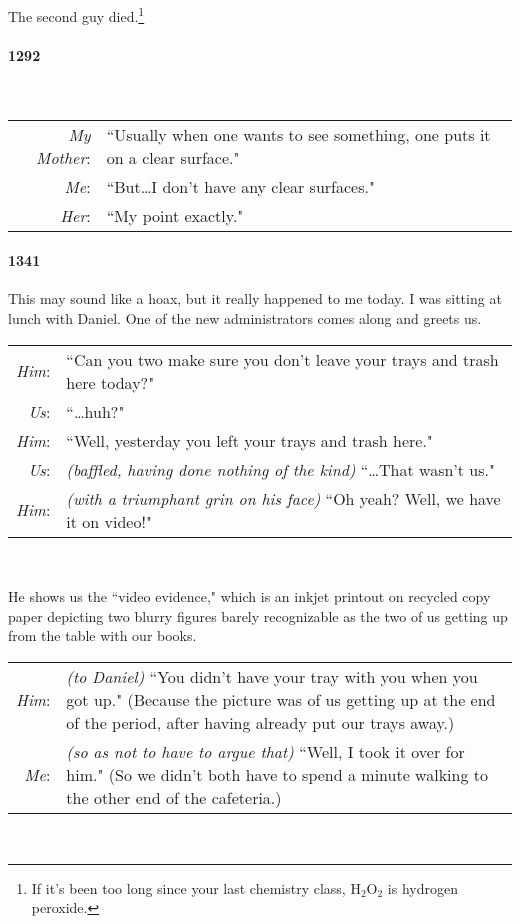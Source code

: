 \documentclass[10pt]{memoir}
\newcommand{\speakertag}[1]{\emph{#1}: }
\newcommand{\st}{\speakertag}
\begin{document}
The second guy died.\footnote{If it's been too long since your last chemistry class, $\textrm{H}_2\textrm{O}_2$ is hydrogen peroxide.}

\paragraph{1292}~\\
\noindent \begin{tabularx}{\textwidth}{r X}
\noindent \st{My Mother} & ``Usually when one wants to see something, one puts it on a clear surface." \\
\st{Me} & ``But\ldots I don't have any clear surfaces." \\
\st{Her} & ``My point exactly." \\
\end{tabularx}

\paragraph{1341} This may sound like a hoax, but it really happened to me today. I was sitting at lunch with Daniel. One of the new administrators comes along and greets us.\\

\noindent \begin{tabularx}{\textwidth}{r X}
\noindent \st{Him} & ``Can you two make sure you don't leave your trays and trash here today?"\\
\st{Us} & ``\ldots huh?"\\
\st{Him} & ``Well, yesterday you left your trays and trash here." \\
\st{Us} & \emph{(baffled, having done nothing of the kind)} ``\ldots That wasn't us."\\
\st{Him} & \emph{(with a triumphant grin on his face)} ``Oh yeah? Well, we have it on video!"
\end{tabularx}\\\smallskip

\noindent He shows us the ``video evidence," which is an inkjet printout on recycled copy paper depicting two blurry figures barely recognizable as the two of us getting up from the table with our books.\\

\noindent \begin{tabularx}{\textwidth}{r X}
\st{Him} & \emph{(to Daniel)} ``You didn't have your tray with you when you got up." (Because the picture was of us getting up at the end of the period, after having already put our trays away.)\\
\st{Me} & \emph{(so as not to have to argue that)} ``Well, I took it over for him." (So we didn't both have to spend a minute walking to the other end of the cafeteria.)\\
\end{tabularx}\\\smallskip
\end{document}
